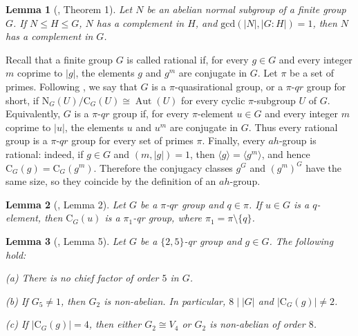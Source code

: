 \documentclass[11pt]{article}
\providecommand{\N}{{\mathrm{N}}}
\providecommand{\C}{{\mathrm{C}}}
\providecommand{\Aut}{{\operatorname{Aut}}}
\providecommand{\gen}[1]{\langle #1 \rangle} %
\providecommand{\gen}[1]{\langle #1 \rangle} %
\providecommand{\gen}[1]{\langle #1 \rangle} %
\newtheorem{lem}{Lemma}
\begin{document}
\begin{lem}[\cite{Gas1952}, Theorem 1]
\label{complement}
    Let $N$ be an abelian normal subgroup of a finite group $G$. 
    If $N\leq H\leq G$, $N$ has a complement in $H$, 
    and $\mathrm{gcd}(|N|, |G:H|)=1$, then $N$ has a complement in $G$.
\end{lem}



    Recall that a finite group $G$ is called rational if, 
    for every $g\in G$ and every integer $m$ coprime to $|g|$, 
    the elements $g$ and $g^m$ are conjugate in $G$.
    Let $\pi$ be a set of primes.
    Following \cite{Knorr1995}, 
    we say that $G$ is a $\pi$-quasirational group, or a $\pi$-$qr$ group for short, 
    if $\N_G(U)/\C_G(U)\cong \Aut(U)$ for every cyclic $\pi$-subgroup $U$ of $G$.
    Equivalently, $G$ is a $\pi$-$qr$ group if, 
    for every $\pi$-element $u\in G$ and every integer $m$ coprime to $|u|$, 
    the elements $u$ and $u^m$ are conjugate in $G$.
    Thus every rational group is a $\pi$-$qr$ group for every set of primes $\pi$.
    Finally, every $ah$-group is rational: indeed, if $g\in G$ and $(m,|g|)=1$, then $\gen{g}=\gen{g^m}$, and hence $\C_G(g)=\C_G(g^m)$.
    Therefore the conjugacy classes $g^G$ and $(g^m)^G$ have the same size, 
    so they coincide by the definition of an $ah$-group.




\begin{lem}[\cite{Knorr1995}, Lemma 2]
\label{CGU}
    Let $G$ be a $\pi$-$qr$ group and $q\in \pi$.
    If $u\in G$ is a $q$-element,
    then $\C_{G}(u)$ is a $\pi_1$-qr group,
    where $\pi_1 = \pi \setminus \{q\}$.
\end{lem}

\begin{lem}[\cite{Knorr1995}, Lemma 5]
\label{25qr}
    Let $G$ be a $\{2, 5\}$-qr group and $g\in G$.
    The following hold:

    (a) There is no chief factor of order $5$ in $G$.

    (b) If $G_5\neq 1$, then $G_2$ is non-abelian.
        In particular, $8\mid |G|$ and $|\C_G(g)|\neq 2$.

    (c) If $|\C_G(g)|=4$, 
        then either $G_2\cong V_4$ or $G_2$ is non-abelian of order $8$.
\end{lem}


    
\end{document}
